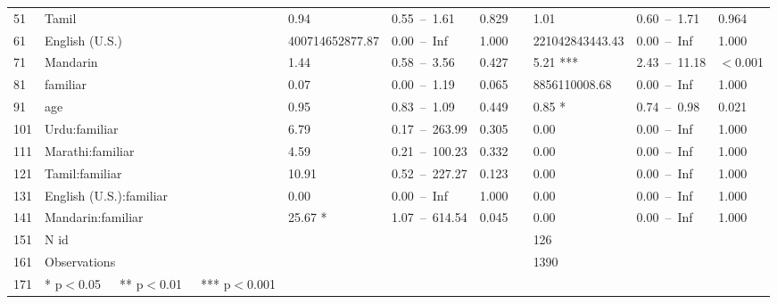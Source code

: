 \begin{table}[ht]
\begin{tabular}{}
  51 & Tamil & 0.94 & 0.55 – 1.61 & 0.829 &  & 1.01 & 0.60 – 1.71 & 0.964 \\ 
  61 & English (U.S.) & 400714652877.87 & 0.00 – Inf & 1.000 &  & 221042843443.43 & 0.00 – Inf & 1.000 \\ 
  71 & Mandarin & 1.44 & 0.58 – 3.56 & 0.427 &  & 5.21 *** & 2.43 – 11.18 & $<$0.001 \\ 
  81 & familiar & 0.07 & 0.00 – 1.19 & 0.065 &  & 8856110008.68 & 0.00 – Inf & 1.000 \\ 
  91 & age & 0.95 & 0.83 – 1.09 & 0.449 &  & 0.85 * & 0.74 – 0.98 & 0.021 \\ 
  101 & Urdu:familiar & 6.79 & 0.17 – 263.99 & 0.305 &  & 0.00 & 0.00 – Inf & 1.000 \\ 
  111 & Marathi:familiar & 4.59 & 0.21 – 100.23 & 0.332 &  & 0.00 & 0.00 – Inf & 1.000 \\ 
  121 & Tamil:familiar & 10.91 & 0.52 – 227.27 & 0.123 &  & 0.00 & 0.00 – Inf & 1.000 \\ 
  131 & English (U.S.):familiar & 0.00 & 0.00 – Inf & 1.000 &  & 0.00 & 0.00 – Inf & 1.000 \\ 
  141 & Mandarin:familiar & 25.67 * & 1.07 – 614.54 & 0.045 &  & 0.00 & 0.00 – Inf & 1.000 \\ 
  151 & N id &  &  &  &  & 126 &  &  \\ 
  161 & Observations &  &  &  &  & 1390 &  &  \\ 
  171 & * p$<$0.05   ** p$<$0.01   *** p$<$0.001 &  &  &  &  &  &  &  \\ 
   \hline
\end{tabular}
\end{table}
